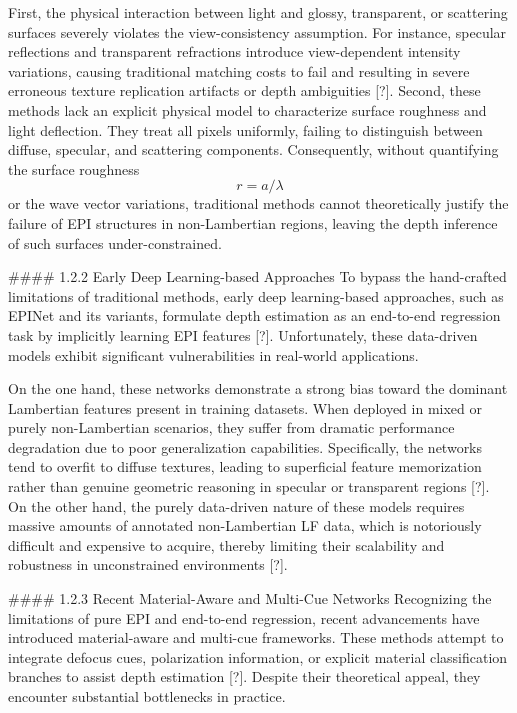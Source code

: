 \documentclass[journal]{IEEEtran}
\begin{document}
First, the physical interaction between light and glossy, transparent, or scattering surfaces severely violates the view-consistency assumption. For instance, specular reflections and transparent refractions introduce view-dependent intensity variations, causing traditional matching costs to fail and resulting in severe erroneous texture replication artifacts or depth ambiguities [?]. Second, these methods lack an explicit physical model to characterize surface roughness and light deflection. They treat all pixels uniformly, failing to distinguish between diffuse, specular, and scattering components. Consequently, without quantifying the surface roughness \[
r = a/\lambda
\] or the wave vector variations, traditional methods cannot theoretically justify the failure of EPI structures in non-Lambertian regions, leaving the depth inference of such surfaces under-constrained.

\#\#\#\# 1.2.2 Early Deep Learning-based Approaches
To bypass the hand-crafted limitations of traditional methods, early deep learning-based approaches, such as EPINet and its variants, formulate depth estimation as an end-to-end regression task by implicitly learning EPI features [?]. Unfortunately, these data-driven models exhibit significant vulnerabilities in real-world applications. 

On the one hand, these networks demonstrate a strong bias toward the dominant Lambertian features present in training datasets. When deployed in mixed or purely non-Lambertian scenarios, they suffer from dramatic performance degradation due to poor generalization capabilities. Specifically, the networks tend to overfit to diffuse textures, leading to superficial feature memorization rather than genuine geometric reasoning in specular or transparent regions [?]. On the other hand, the purely data-driven nature of these models requires massive amounts of annotated non-Lambertian LF data, which is notoriously difficult and expensive to acquire, thereby limiting their scalability and robustness in unconstrained environments [?].

\#\#\#\# 1.2.3 Recent Material-Aware and Multi-Cue Networks
Recognizing the limitations of pure EPI and end-to-end regression, recent advancements have introduced material-aware and multi-cue frameworks. These methods attempt to integrate defocus cues, polarization information, or explicit material classification branches to assist depth estimation [?]. Despite their theoretical appeal, they encounter substantial bottlenecks in practice. 
\end{document}
